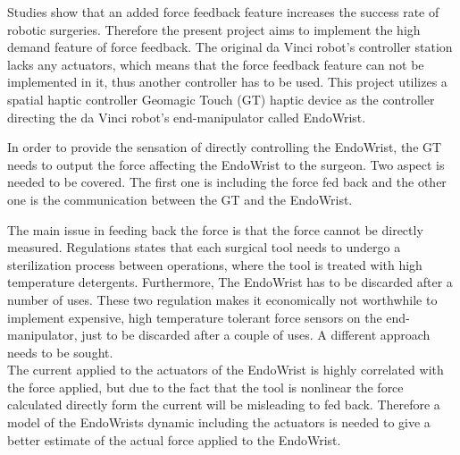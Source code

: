 Studies show that an added force feedback feature increases the success rate of robotic surgeries\cite{lack_fb}. Therefore the present project aims to implement the high demand feature of force feedback. The original da Vinci robot's controller station lacks any actuators, which means that the force feedback feature can not be implemented in it, thus another controller has to be used. This project utilizes a spatial haptic controller Geomagic Touch (GT) haptic device as the controller directing the da Vinci robot's end-manipulator called EndoWrist. 







In order to provide the sensation of directly controlling the EndoWrist, the GT needs to output the force affecting the EndoWrist to the surgeon. Two aspect is needed to be covered. The first one is including the force fed back and the other one is the communication between the GT and the EndoWrist. 

The main issue in feeding back the force is that the force cannot be directly measured. Regulations states that each surgical tool needs to undergo a sterilization process between operations, where the tool is treated with high temperature detergents. Furthermore, The EndoWrist has to be discarded after a number of uses\cite{catalog_davinci}. These two regulation makes it economically not worthwhile to implement expensive, high temperature tolerant force sensors on the end-manipulator, just to be discarded after a couple of uses. A different approach needs to be sought.\\
The current applied to the actuators of the EndoWrist is highly correlated with the force applied, but due to the fact that the tool is nonlinear the force calculated directly form the current will be misleading to fed back. Therefore a model of the EndoWrists dynamic including the actuators is needed to give a better estimate of the actual force applied to the EndoWrist.

